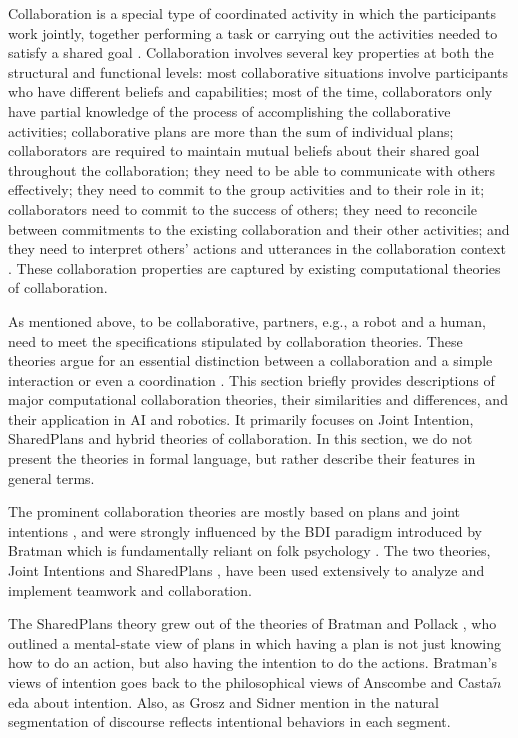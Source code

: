 \documentclass[12pt]{report}
\begin{document}
Collaboration is a special type of coordinated activity in which the
participants work jointly, together performing a task or carrying out the
activities needed to satisfy a shared goal \cite{grosz:collaboration}.
Collaboration involves several key properties at both the structural and
functional levels: most collaborative situations involve participants who have
different beliefs and capabilities; most of the time, collaborators only have
partial knowledge of the process of accomplishing the collaborative activities;
collaborative plans are more than the sum of individual plans; collaborators are
required to maintain mutual beliefs about their shared goal throughout the
collaboration; they need to be able to communicate with others effectively; they
need to commit to the group activities and to their role in it; collaborators
need to commit to the success of others; they need to reconcile between
commitments to the existing collaboration and their other activities; and they
need to interpret others' actions and utterances in the collaboration context
\cite{grosz:mice-menus}. These collaboration properties are captured by existing
computational theories of collaboration.

As mentioned above, to be collaborative, partners, e.g., a robot and a human,
need to meet the specifications stipulated by collaboration theories. These
theories argue for an essential distinction between a collaboration and a simple
interaction or even a coordination \cite{grosz:shared-plans,
lochbaum:collaborative-planning}. This section briefly provides descriptions of
major computational collaboration theories, their similarities and differences,
and their application in AI and robotics. It primarily focuses on Joint
Intention, SharedPlans and hybrid theories of collaboration. In this section, we
do not present the theories in formal language, but rather describe their
features in general terms.

The prominent collaboration theories are mostly based on plans and joint
intentions \cite{cohen:teamwork} \cite{grosz:plans-discourse}
\cite{Litman:discourse-commonsense}, and were strongly influenced by the BDI
paradigm introduced by Bratman \cite{bratman:intentions-plans} which is
fundamentally reliant on folk psychology \cite{ravenscroft:folk}. The two
theories, Joint Intentions \cite{cohen:teamwork} and SharedPlans
\cite{grosz:plans-discourse}, have been used extensively to analyze and
implement teamwork and collaboration.

The SharedPlans theory grew out of the theories of Bratman and Pollack
\cite{bratman:plans-reasoning,pollack:plan-inference,
pollack:plan-mental-attitudes}, who outlined a mental-state view of plans in
which having a plan is not just knowing how to do an action, but also having the
intention to do the actions. Bratman's views of intention goes back to the
philosophical views of Anscombe \cite{anscombe:intention} and
Casta$\tilde{n}$eda \cite{castaneda:thinking} about intention. Also, as Grosz
and Sidner mention in \cite{grosz:plans-discourse} the natural segmentation of
discourse reflects intentional behaviors in each segment.
\end{document}
